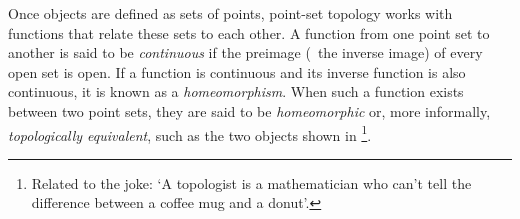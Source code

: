 Once objects are defined as sets of points, point-set topology works with functions that relate these sets to each other.
A function from one point set to another is said to be \emph{continuous} if the preimage (\ie\ the inverse image) of every open set is open.
If a function is continuous and its inverse function is also continuous, it is known as a \emph{homeomorphism}.
When such a function exists between two point sets, they are said to be \emph{homeomorphic} or, more informally, \emph{topologically equivalent}, such as the two objects shown in \footnote{Related to the joke: `A topologist is a mathematician who can't tell the difference between a coffee mug and a donut'.}.

\begin{figure}[tbp]
\centering
{} \quad
{}

\end{figure}
